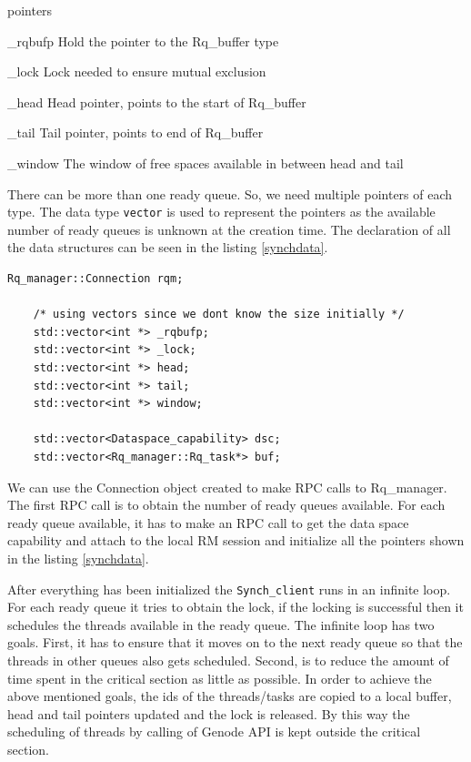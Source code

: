 \begin{labeling}{pointers}
	\item [\_rqbufp] Hold the pointer to the Rq\_buffer type
	\item [\_lock] Lock needed to ensure mutual exclusion
	\item [\_head] Head pointer, points to the start of Rq\_buffer
	\item [\_tail] Tail pointer, points to end of Rq\_buffer
	\item [\_window] The window of free spaces available in between head and tail
\end{labeling}
 
There can be more than one ready queue. So, we need multiple pointers of each type. The data type \texttt{vector} is used to represent the pointers as the available number of ready queues is unknown at the creation time. The declaration of all the data structures can be seen in the listing \ref{synchdata}. 

\begin{lstlisting}[caption={Data structures used in Synch\_client},label={synchdata}, style=customcpp]
	Rq_manager::Connection rqm;
	
	/* using vectors since we dont know the size initially */
	std::vector<int *> _rqbufp;
	std::vector<int *> _lock;
	std::vector<int *> head; 
	std::vector<int *> tail; 
	std::vector<int *> window;
	
	std::vector<Dataspace_capability> dsc;
	std::vector<Rq_manager::Rq_task*> buf;
\end{lstlisting}

We can use the Connection object created to make RPC calls to Rq\_manager. The first RPC call is to obtain the number of ready queues available. For each ready queue available, it has to make an RPC call to get the data space capability and attach to the local RM session and initialize all the pointers shown in the listing \ref{synchdata}. 

After everything has been initialized the \texttt{Synch\_client} runs in an infinite loop. For each ready queue it tries to obtain the lock, if the locking is successful then it schedules the threads available in the ready queue. The infinite loop has two goals. First, it has to ensure that it moves on to the next ready queue so that the threads in other queues also gets scheduled. Second, is to reduce the amount of time spent in the critical section as little as possible. In order to achieve the above mentioned goals, the ids of the threads/tasks are copied to a local buffer, head and tail pointers updated and the lock is released. By this way the scheduling of threads by calling of Genode API is kept outside the critical section.


